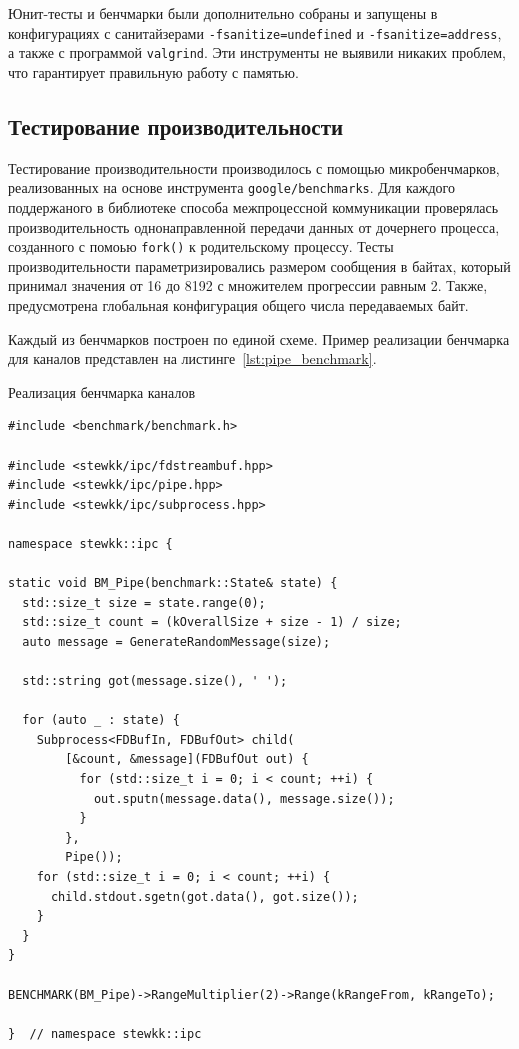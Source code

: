 \documentclass[14pt, russian]{scrartcl}
\begin{document}
Юнит-тесты и бенчмарки были дополнительно собраны и запущены в конфигурациях с
санитайзерами \verb|-fsanitize=undefined| и \verb|-fsanitize=address|, а также с
программой \verb|valgrind|. Эти инструменты не выявили никаких проблем, что
гарантирует правильную работу с памятью.

\subsection{Тестирование производительности}

Тестирование производительности производилось с помощью микробенчмарков,
реализованных на основе инструмента \verb|google/benchmarks|. Для каждого
поддержаного в библиотеке способа межпроцессной коммуникации проверялась
производительность однонаправленной передачи данных от дочернего процесса,
созданного с помоью \verb|fork()| к родительскому процессу. Тесты
производительности параметризировались размером сообщения в байтах, который
принимал значения от 16 до 8192 с множителем прогрессии равным 2. Также,
предусмотрена глобальная конфигурация общего числа передаваемых байт.

Каждый из бенчмарков построен по единой схеме. Пример реализации бенчмарка для
каналов представлен на листинге~\ref{lst:pipe_benchmark}.

\begin{listing}[H]
  \caption{Реализация бенчмарка каналов}
  \label{lst:pipe_benchmark}
  \begin{verbatim}
#include <benchmark/benchmark.h>

#include <stewkk/ipc/fdstreambuf.hpp>
#include <stewkk/ipc/pipe.hpp>
#include <stewkk/ipc/subprocess.hpp>

namespace stewkk::ipc {

static void BM_Pipe(benchmark::State& state) {
  std::size_t size = state.range(0);
  std::size_t count = (kOverallSize + size - 1) / size;
  auto message = GenerateRandomMessage(size);

  std::string got(message.size(), ' ');

  for (auto _ : state) {
    Subprocess<FDBufIn, FDBufOut> child(
        [&count, &message](FDBufOut out) {
          for (std::size_t i = 0; i < count; ++i) {
            out.sputn(message.data(), message.size());
          }
        },
        Pipe());
    for (std::size_t i = 0; i < count; ++i) {
      child.stdout.sgetn(got.data(), got.size());
    }
  }
}

BENCHMARK(BM_Pipe)->RangeMultiplier(2)->Range(kRangeFrom, kRangeTo);

}  // namespace stewkk::ipc
  \end{verbatim}
\end{listing}
\end{document}
